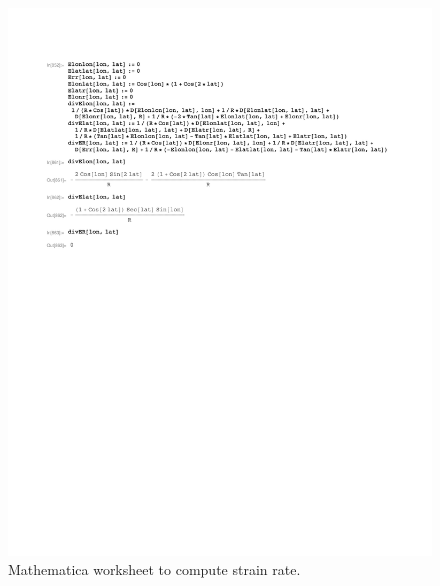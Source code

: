 \documentclass[11pt]{report}
\begin{document}
\begin{figure}[htbp]
 \center
 \includegraphics[scale=0.8, trim = 0 4in 0 0, clip]{f/130520_ELonLat_coscos.pdf}
 \caption{Mathematica worksheet to compute strain rate.}
 \label{fig:mathematica4}
\end{figure}
\end{document}
